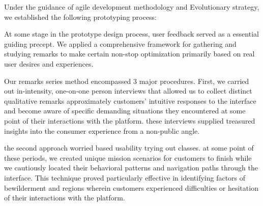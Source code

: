 Under the guidance of agile development methodology and Evolutionary strategy, we established the following prototyping process:

At some stage in the prototype design process, user feedback served as a essential guiding precept. We applied a comprehensive framework for gathering and studying remarks to make certain non-stop optimization primarily based on real user desires and experiences.

Our remarks series method encompassed 3 major procedures. First, we carried out in-intensity, one-on-one person interviews that allowed us to collect distinct qualitative remarks approximately customers' intuitive responses to the interface and become aware of specific demanding situations they encountered at some point of their interactions with the platform. these interviews supplied treasured insights into the consumer experience from a non-public angle.

the second approach worried based usability trying out classes. at some point of these periods, we created unique mission scenarios for customers to finish while we cautiously located their behavioral patterns and navigation paths through the interface. This technique proved particularly effective in identifying factors of bewilderment and regions wherein customers experienced difficulties or hesitation of their interactions with the platform.

